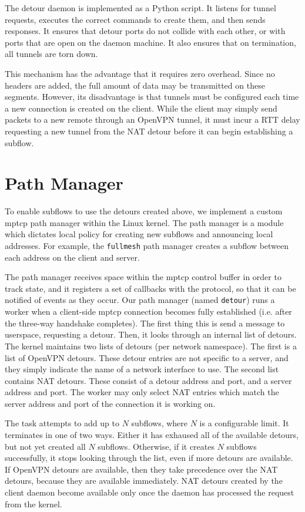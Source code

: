 \documentclass{cwru}
\begin{document}
The detour daemon is implemented as a Python script. It listens for tunnel
requests, executes the correct commands to create them, and then sends
responses. It ensures that detour ports do not collide with each other, or with
ports that are open on the daemon machine. It also ensures that on termination,
all tunnels are torn down.

This mechanism has the advantage that it requires zero overhead. Since no
headers are added, the full amount of data may be transmitted on these segments.
However, its disadvantage is that tunnels must be configured each time a new
connection is created on the client. While the client may simply send packets to
a new remote through an OpenVPN tunnel, it must incur a RTT delay requesting a
new tunnel from the NAT detour before it can begin establishing a subflow.

\section{Path Manager}

To enable subflows to use the detours created above, we implement a custom \ac{mptcp}
path manager within the Linux kernel. The path manager is a module which
dictates local policy for creating new subflows and announcing local addresses.
For example, the \texttt{fullmesh} path manager creates a subflow between each
address on the client and server.

The path manager receives space within the \ac{mptcp} control buffer in order to
track state, and it registers a set of callbacks with the protocol, so that it
can be notified of events as they occur. Our path manager (named
\texttt{detour}) runs a worker when a client-side \ac{mptcp} connection becomes fully
established (i.e. after the three-way handshake completes). The first thing this
is send a message to userspace, requesting a detour. Then, it looks through an
internal list of detours. The kernel maintains two lists of detours (per network
namespace). The first is a list of OpenVPN detours. These detour entries are not
specific to a server, and they simply indicate the name of a network interface
to use. The second list contains NAT detours. These consist of a detour address
and port, and a server address and port. The worker may only select NAT entries
which match the server address and port of the connection it is working on.

The task attempts to add up to $N$ subflows, where $N$ is a configurable limit.
It terminates in one of two ways. Either it has exhaused all of the available
detours, but not yet created all $N$ subflows. Otherwise, if it creates $N$
subflows successfully, it stops looking through the list, even if more detours
are available. If OpenVPN detours are available, then they take precedence over
the NAT detours, because they are available immediately. NAT detours created by
the client daemon become available only once the daemon has processed the
request from the kernel.
\end{document}
